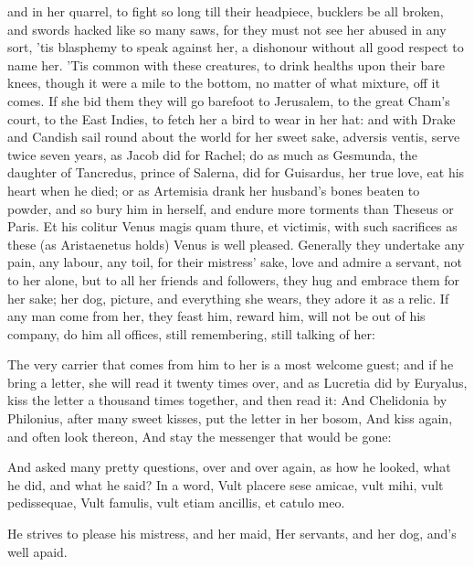 and in her quarrel, to fight so long till their headpiece,
bucklers be all broken, and swords hacked like so many saws, for they
must not see her abused in any sort, 'tis blasphemy to speak against
her, a dishonour without all good respect to name her. 'Tis common with
these creatures, to drink healths upon their bare knees, though
it were a mile to the bottom, no matter of what mixture, off it comes.
If she bid them they will go barefoot to Jerusalem, to the great Cham's
court,  to the East Indies, to fetch her a bird to wear in her
hat: and with Drake and Candish sail round about the world for her
sweet sake, adversis ventis, serve twice seven years, as Jacob did for
Rachel; do as much as Gesmunda, the daughter of Tancredus, prince
of Salerna, did for Guisardus, her true love, eat his heart when he
died; or as Artemisia drank her husband's bones beaten to powder, and
so bury him in herself, and endure more torments than Theseus or Paris.
Et his colitur Venus magis quam thure, et victimis, with such
sacrifices as these (as  Aristaenetus holds) Venus is well
pleased. Generally they undertake any pain, any labour, any toil, for
their mistress' sake, love and admire a servant, not to her alone, but
to all her friends and followers, they hug and embrace them for her
sake; her dog, picture, and everything she wears, they adore it as a
relic. If any man come from her, they feast him, reward him, will not
be out of his company, do him all offices, still remembering, still
talking of her:

The very carrier that comes from him to her is a most welcome guest;
and if he bring a letter, she will read it twenty times over, and as
 Lucretia did by Euryalus, kiss the letter a thousand times
together, and then read it: And Chelidonia by Philonius, after
many sweet kisses, put the letter in her bosom,
And kiss again, and often look thereon,
And stay the messenger that would be gone:

And asked many pretty questions, over and over again, as how he looked,
what he did, and what he said? In a word,
Vult placere sese amicae, vult mihi, vult pedissequae,
Vult famulis, vult etiam ancillis, et catulo meo.

He strives to please his mistress, and her maid,
Her servants, and her dog, and's well apaid.

